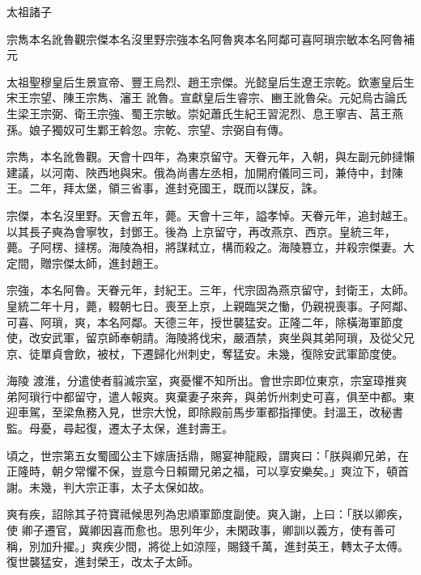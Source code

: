 
\begin{pinyinscope}

 太祖諸子



 宗雋本名訛魯觀宗傑本名沒里野宗強本名阿魯爽本名阿鄰可喜阿瑣宗敏本名阿魯補元



 太祖聖穆皇后生景宣帝、豐王烏烈、趙王宗傑。光懿皇后生遼王宗乾。欽憲皇后生宋王宗望、陳王宗雋、瀋王
 訛魯。宣獻皇后生睿宗、豳王訛魯朵。元妃烏古論氏生梁王宗弼、衛王宗強、蜀王宗敏。崇妃蕭氏生紀王習泥烈、息王寧吉、莒王燕孫。娘子獨奴可生鄴王斡忽。宗乾、宗望、宗弼自有傳。



 宗雋，本名訛魯觀。天會十四年，為東京留守。天眷元年，入朝，與左副元帥撻懶建議，以河南、陜西地與宋。俄為尚書左丞相，加開府儀同三司，兼侍中，封陳王。二年，拜太堡，領三省事，進封兗國王，既而以謀反，誅。



 宗傑，本名沒里野。天會五年，薨。天會十三年，謚孝悼。天眷元年，追封越王。以其長子奭為會寧牧，封鄧王。後為
 上京留守，再改燕京、西京。皇統三年，薨。子阿楞、撻楞。海陵為相，將謀弒立，構而殺之。海陵篡立，并殺宗傑妻。大定間，贈宗傑太師，進封趙王。



 宗強，本名阿魯。天眷元年，封紀王。三年，代宗固為燕京留守，封衛王，太師。皇統二年十月，薨，輟朝七日。喪至上京，上親臨哭之慟，仍親視喪事。子阿鄰、可喜、阿瑣，爽，本名阿鄰。天德三年，授世襲猛安。正隆二年，除橫海軍節度使，改安武軍，留京師奉朝請。海陵將伐宋，嚴酒禁，爽坐與其弟阿瑣，及從父兄京、徒單貞會飲，被杖，下遷歸化州刺史，奪猛安。未幾，復除安武軍節度使。



 海陵
 渡淮，分遣使者翦滅宗室，爽憂懼不知所出。會世宗即位東京，宗室璋推爽弟阿瑣行中都留守，遣人報爽。爽棄妻子來奔，與弟忻州刺史可喜，俱至中都。東迎車駕，至梁魚務入見，世宗大悅，即除殿前馬步軍都指揮使。封溫王，改秘書監。母憂，尋起復，遷太子太保，進封壽王。



 頃之，世宗第五女蜀國公主下嫁唐括鼎，賜宴神龍殿，謂爽曰：「朕與卿兄弟，在正隆時，朝夕常懼不保，豈意今日賴爾兄弟之福，可以享安樂矣。」爽泣下，頓首謝。未幾，判大宗正事，太子太保如故。



 爽有疾，詔除其子符寶祗候思列為忠順軍節度副使。爽入謝，上曰：「朕以卿疾，使
 卿子遷官，冀卿因喜而愈也。思列年少，未閑政事，卿訓以義方，使有善可稱，別加升擢。」爽疾少間，將從上如涼陘，賜錢千萬，進封英王，轉太子太傅。復世襲猛安，進封榮王，改太子太師。




\end{pinyinscope}
